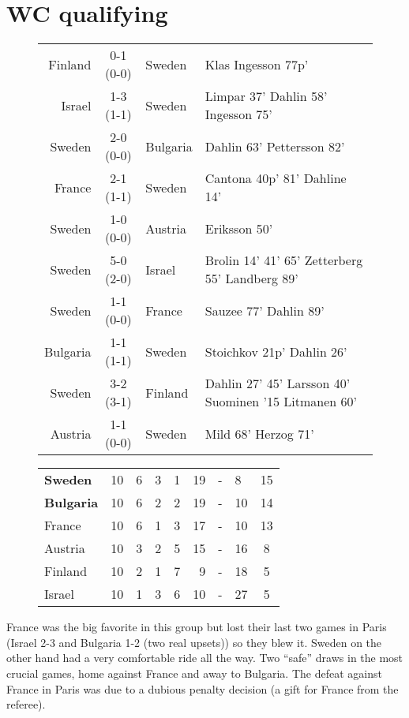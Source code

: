 \section{WC qualifying}
\begin{figure}[H]
\begin{tabular}{r c l l}
Finland & 0-1 (0-0) & Sweden & Klas Ingesson 77p' \\
Israel & 1-3 (1-1) & Sweden & Limpar 37' Dahlin 58' Ingesson 75' \\
Sweden & 2-0 (0-0) & Bulgaria & Dahlin 63' Pettersson 82' \\
France & 2-1 (1-1) & Sweden & Cantona 40p' 81' Dahline 14' \\
Sweden & 1-0 (0-0) & Austria & Eriksson 50' \\
Sweden & 5-0 (2-0) & Israel & Brolin 14' 41' 65' Zetterberg 55' Landberg 89' \\
Sweden & 1-1 (0-0) & France & Sauzee 77' Dahlin 89' \\
Bulgaria & 1-1  (1-1) & Sweden & Stoichkov 21p' Dahlin 26' \\
Sweden & 3-2 (3-1) & Finland & Dahlin 27' 45' Larsson 40' Suominen '15 Litmanen 60' \\
Austria & 1-1 (0-0) & Sweden &  Mild 68' Herzog 71' \\
\end{tabular}
\end{figure}
\begin{figure}[H]
\begin{tabular} {l c c c c r c l c}
\textbf{Sweden} & 10 & 6 & 3 & 1 & 19 & - & 8 & 15 \\
\textbf{Bulgaria} & 10 & 6 & 2 & 2 & 19 & - & 10 & 14 \\
France & 10 & 6 & 1 & 3 & 17 & - & 10 & 13 \\
Austria & 10 & 3 & 2 & 5 & 15 & - & 16 & 8 \\
Finland & 10 & 2 & 1 & 7 & 9 & - & 18 & 5 \\
Israel & 10 & 1 & 3 & 6 & 10 & - & 27 & 5 \\
\end{tabular}
\end{figure}
France was the big favorite in this group but lost their last two games in 
Paris (Israel 2-3 and Bulgaria 1-2 (two real upsets)) so they blew it. Sweden 
on the other hand had a very comfortable ride all the way. Two ``safe'' draws in 
the most crucial games, home against France and away to Bulgaria. The defeat 
against France in Paris was due to a dubious penalty decision (a gift for 
France from the referee).

